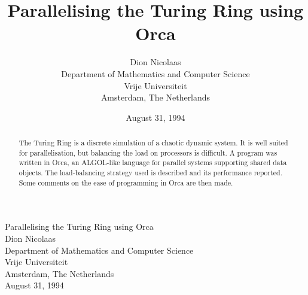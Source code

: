 

\title{Parallelising the Turing Ring using Orca}

\author{Dion Nicolaas\\
	Department of Mathematics and Computer Science \\
        Vrije Universiteit \\
	Amsterdam, The Netherlands}
\date{August 31, 1994}


\begin{titlepage}
\hspace{2cm}
\parbox{10cm}{
	\begin{small}
	\begin{center}
		{\Large Parallelising the Turing Ring using Orca} \\
	\vspace{1cm}
		Dion Nicolaas\\
		Department of Mathematics and Computer Science \\
		Vrije Universiteit \\
		Amsterdam, The Netherlands \\
	\vspace{2cm}
		August 31, 1994
	\end{center}
	\end{small}
\vspace{12.2cm}
\hspace{7cm}
\epsfxsize=3.5cm
}
\end{titlepage}

\begin{abstract}
The Turing Ring is a discrete simulation of a chaotic dynamic system. It
is well suited for parallelisation, but balancing the load on processors
is difficult. A program was written in Orca, an ALGOL-like language for
parallel systems supporting shared data objects.
The load-balancing strategy used is described and its performance
reported. Some comments on the ease of programming in Orca are then
made.
\end{abstract}















